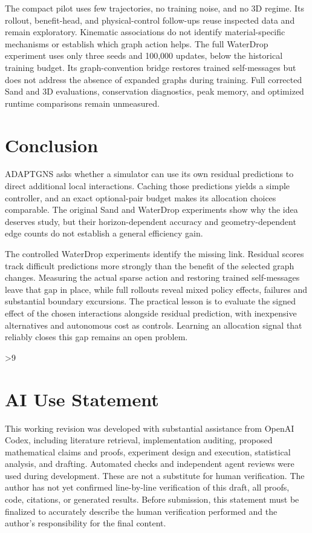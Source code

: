 The compact pilot uses few trajectories, no training noise, and no 3D regime. Its rollout, benefit-head, and physical-control follow-ups reuse inspected data and remain exploratory. Kinematic associations do not identify material-specific mechanisms or establish which graph action helps. The full WaterDrop experiment uses only three seeds and 100,000 updates, below the historical training budget. Its graph-convention bridge restores trained self-messages but does not address the absence of expanded graphs during training. Full corrected Sand and 3D evaluations, conservation diagnostics, peak memory, and optimized runtime comparisons remain unmeasured.

\section{Conclusion}
ADAPTGNS asks whether a simulator can use its own residual predictions to direct additional local interactions. Caching those predictions yields a simple controller, and an exact optional-pair budget makes its allocation choices comparable. The original Sand and WaterDrop experiments show why the idea deserves study, but their horizon-dependent accuracy and geometry-dependent edge counts do not establish a general efficiency gain.

The controlled WaterDrop experiments identify the missing link. Residual scores track difficult predictions more strongly than the benefit of the selected graph changes. Measuring the actual sparse action and restoring trained self-messages leave that gap in place, while full rollouts reveal mixed policy effects, failures and substantial boundary excursions. The practical lesson is to evaluate the signed effect of the chosen interactions alongside residual prediction, with inexpensive alternatives and autonomous cost as controls. Learning an allocation signal that reliably closes this gap remains an open problem.

\clearpage
{}
\ifnum\value{page}>9
  \PackageError{research-revision}{Main text exceeds the eight-page limit}{Shorten the main text before submission.}
\fi
\section*{AI Use Statement}
This working revision was developed with substantial assistance from OpenAI Codex, including literature retrieval, implementation auditing, proposed mathematical claims and proofs, experiment design and execution, statistical analysis, and drafting. Automated checks and independent agent reviews were used during development. These are not a substitute for human verification. The author has not yet confirmed line-by-line verification of this draft, all proofs, code, citations, or generated results. Before submission, this statement must be finalized to accurately describe the human verification performed and the author's responsibility for the final content.

